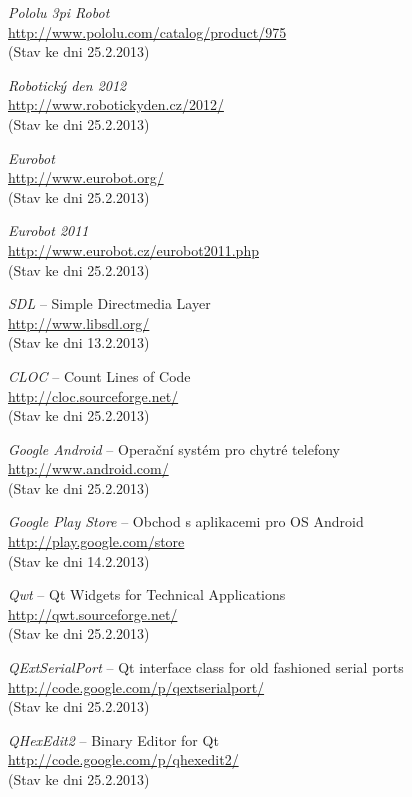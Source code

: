 \documentclass[12pt, a4paper, oneside]{article}
\newcommand{\It}{\textit}  %
\begin{document}
\begin{thebibliography}{99}
     \It{Pololu 3pi Robot} \\
    \url{http://www.pololu.com/catalog/product/975}\\
    (Stav ke dni 25.2.2013)

     \It{Robotický den 2012} \\
    \url{http://www.robotickyden.cz/2012/}\\
    (Stav ke dni 25.2.2013)

     \It{Eurobot} \\
    \url{http://www.eurobot.org/}\\
    (Stav ke dni 25.2.2013)

     \It{Eurobot 2011} \\
    \url{http://www.eurobot.cz/eurobot2011.php}\\
    (Stav ke dni 25.2.2013)

     \It{SDL} -- Simple Directmedia Layer \\
    \url{http://www.libsdl.org/}\\
    (Stav ke dni 13.2.2013)

     \It{CLOC} -- Count Lines of Code \\
    \url{http://cloc.sourceforge.net/}\\
    (Stav ke dni 25.2.2013)

     \It{Google Android} -- Operační systém pro chytré telefony\\
    \url{http://www.android.com/}\\
    (Stav ke dni 25.2.2013)

     \It{Google Play Store} -- Obchod s aplikacemi pro OS Android\\
    \url{http://play.google.com/store}\\
    (Stav ke dni 14.2.2013)

     \It{Qwt} -- Qt Widgets for Technical Applications \\
    \url{http://qwt.sourceforge.net/}\\
    (Stav ke dni 25.2.2013)

     \It{QExtSerialPort} -- Qt interface class for old fashioned serial ports \\
    \url{http://code.google.com/p/qextserialport/}\\
    (Stav ke dni 25.2.2013)

     \It{QHexEdit2} -- Binary Editor for Qt \\
    \url{http://code.google.com/p/qhexedit2/}\\
    (Stav ke dni 25.2.2013)


\end{thebibliography}
\end{document}
